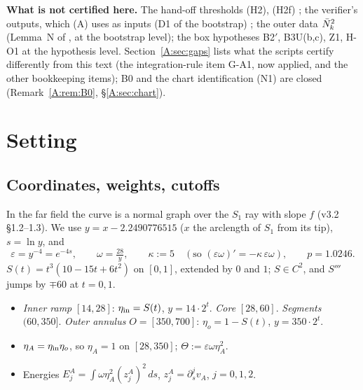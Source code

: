 \documentclass[11pt]{article}
\begin{document}
\noindent\textbf{What is not certified here.} The hand-off thresholds (H2), (H2f) \tH; the verifier's outputs, which (A) uses as inputs (D1 of the bootstrap) \tH; the outer data $\bar N^2_k$ (Lemma~N of , at the bootstrap level); the box hypotheses B2$'$, B3U(b,c), Z1, H-O1 at the hypothesis level. Section~\ref{A:sec:gaps} lists what the scripts certify differently from this text (the integration-rule item G-A1, now applied, and the other bookkeeping items); B0 and the chart identification (N1) are closed (Remark~\ref{A:rem:B0}, \S\ref{A:sec:chart}).

\section{Setting}\label{A:sec:set}
\subsection{Coordinates, weights, cutoffs}
In the far field the curve is a normal graph over the $S_1$ ray with slope $f$ (v3.2 \S1.2--1.3). We use $y=x-2.2490776515$ ($x$ the arclength of $S_1$ from its tip), $s=\ln y$, and
\[
\varepsilon=y^{-4}=e^{-4s},\qquad \omega=\tfrac{28}{y},\qquad \kappa:=5\quad(\text{so }(\varepsilon\omega)'=-\kappa\,\varepsilon\omega),\qquad p=1.0246 .
\]
$S(t)=t^3(10-15t+6t^2)$ on $[0,1]$, extended by $0$ and $1$; $S\in C^2$, and $S'''$ jumps by $\mp60$ at $t=0,1$.
\begin{itemize}[leftmargin=*]
\item \emph{Inner ramp} $[14,28]$: $\eta_{\rm in}=S(t)$, $y=14\cdot2^t$. \emph{Core} $[28,60]$. \emph{Segments} $(60,350]$. \emph{Outer annulus} $O=[350,700]$: $\eta_o=1-S(t)$, $y=350\cdot2^t$.
\item $\eta_A=\eta_{\rm in}\eta_o$, so $\eta_A=1$ on $[28,350]$; $\Theta:=\varepsilon\omega\eta_A^2$.
\item Energies $E^A_j=\int\omega\eta_A^2(z^A_j)^2\,ds$, $z^A_j=\partial_s^jv_A$, $j=0,1,2$.
\end{itemize}
\end{document}
